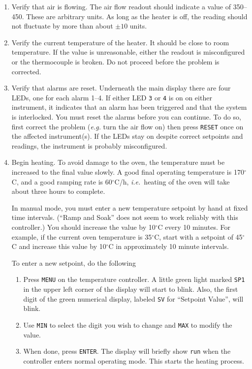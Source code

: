 \begin{enumerate}
\item Verify that air is flowing. The air flow readout should indicate
  a value of 350--450. These are arbitrary units. As long as the heater is
  off, the reading should not fluctuate by more than about $\pm 10$ units.

\item Verify the current temperature of the heater. It should be
  close to room temperature. If the value is unreasonable, either
  the readout is misconfigured or the thermocouple is broken.
  Do not proceed before the problem is corrected.

\item Verify that alarms are reset. 
  Underneath the main display there are four LEDs, one for each
  alarm 1--4. If either LED {\tt 3} or {\tt 4} is on on either
  instrument, it indicates that an alarm has been triggered and
  that the system is interlocked. You must reset the alarms before
  you can continue. To do so, first correct
  the problem ({\it e.g.}\/ turn the air flow on) then press {\tt RESET}
  once on the affected instrument(s). If the LEDs stay on despite
  correct setpoints and readings, the instrument is probably misconfigured.

\item Begin heating. 
  To avoid damage to the oven, the temperature must be increased
  to the final value slowly. A good final operating temperature is
  170$^\circ$C, and a good ramping rate is 60$^\circ$C/h, {\it i.e.\/}\
  heating of the oven will take about three hours to complete.
  
  In manual mode, you must enter a new temperature setpoint by hand
  at fixed time intervals. (``Ramp and Soak'' does not seem to work reliably
  with this controller.) You should increase the  value by
  10$^\circ$C every 10 minutes. For example, if the current oven temperature
  is 35$^\circ$C, start with a setpoint of 45$^\circ$C and increase this
  value by 10$^\circ$C in approximately 10 minute intervals.

  To enter a new setpoint, do the following
  \begin{enumerate}
   \item Press {\tt MENU} on the temperature controller. 
         A little green light marked {\tt SP1} in the upper left corner of 
         the display will start to blink. Also, the first digit of
         the green numerical display, labeled {\tt SV} for ``Setpoint
         Value'', will blink.
   \item Use {\tt MIN} to select the digit you wish to change and {\tt MAX}
         to modify the value.
   \item When done, press {\tt ENTER}. The display will briefly show
         {\tt run} when the controller enters normal operating mode.
         This starts the heating process.
  \end{enumerate}


\end{enumerate}
